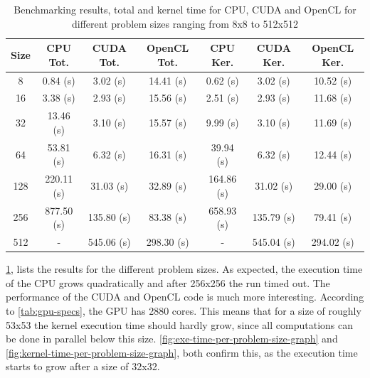 \documentclass[final]{report}
\begin{document}
\begin{table}[H]
	\centering
	\caption{Benchmarking results, total and kernel time for CPU, CUDA and OpenCL for different problem sizes ranging from 8x8 to 512x512}
	\label{tab:results-problem-size}
	\begin{tabular}{ccccccc}
		\toprule
			\textbf{Size}		& \textbf{CPU Tot.}	& \textbf{CUDA Tot.}	& \textbf{OpenCL Tot.}	& \textbf{CPU Ker.}	& \textbf{CUDA Ker.}	& \textbf{OpenCL Ker.}\\
		\midrule
			8					& 0.84 (s)			& 3.02 (s)				& 14.41 (s)				& 0.62 (s)			& 3.02 (s)				& 10.52 (s) \\
			16					& 3.38 (s)			& 2.93 (s)				& 15.56 (s)				& 2.51 (s)			& 2.93 (s)				& 11.68 (s) \\
			32					& 13.46 (s)			& 3.10 (s)				& 15.57 (s)				& 9.99 (s)			& 3.10 (s)				& 11.69 (s) \\
			64					& 53.81 (s)			& 6.32 (s)				& 16.31 (s)				& 39.94 (s)			& 6.32 (s)				& 12.44 (s) \\
			128					& 220.11 (s)		& 31.03 (s)				& 32.89 (s)				& 164.86 (s)		& 31.02 (s)				& 29.00 (s) \\
			256					& 877.50 (s)		& 135.80 (s)			& 83.38 (s)				& 658.93 (s)		& 135.79 (s)			& 79.41 (s) \\
			512					& -					& 545.06 (s)			& 298.30 (s)			& -					& 545.04 (s)				& 294.02 (s) \\
		\bottomrule
	\end{tabular}
\end{table}

\cref{tab:results-problem-size}, lists the results for the different problem sizes.
As expected, the execution time of the CPU grows quadratically and after 256x256 the run timed out. 
The performance of the CUDA and OpenCL code is much more interesting.
According to \cref{tab:gpu-specs}, the GPU has 2880 cores.
This means that for a size of roughly 53x53 the kernel execution time should hardly grow, since all computations can be done in parallel below this size.
\cref{fig:exe-time-per-problem-size-graph} and \cref{fig:kernel-time-per-problem-size-graph}, both confirm this, as the execution time starts to grow after a size of 32x32.
\end{document}
